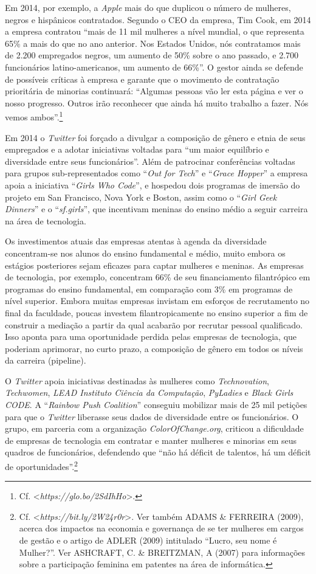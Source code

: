 Em 2014, por exemplo, a \emph{Apple} mais do que duplicou o número de
mulheres, negros e hispânicos contratados. Segundo o CEO da empresa, Tim
Cook, em 2014 a empresa contratou ``mais de 11 mil mulheres a nível
mundial, o que representa 65\% a mais do que no ano anterior. Nos
Estados Unidos, nós contratamos mais de 2.200 empregados negros, um
aumento de 50\% sobre o ano passado, e 2.700 funcionários
latino-americanos, um aumento de 66\%''. O gestor ainda se defende de
possíveis críticas à empresa e garante que o movimento de contratação
prioritária de minorias continuará: ``Algumas pessoas vão ler esta
página e ver o nosso progresso. Outros irão reconhecer que ainda há
muito trabalho a fazer. Nós vemos ambos''.\footnote{Cf.
  \textless{}\emph{https://glo.bo/2SdIhHo}\textgreater{}.}

Em 2014 o \emph{Twitter} foi forçado a divulgar a composição de gênero e
etnia de seus empregados e a adotar iniciativas voltadas para ``um maior
equilíbrio e diversidade entre seus funcionários''. Além de patrocinar
conferências voltadas para grupos sub-representados como ``\emph{Out for
Tech}'' e ``\emph{Grace Hopper}'' a empresa apoia a iniciativa
``\emph{Girls Who Code}'', e hospedou dois programas de imersão do
projeto em San Francisco, Nova York e Boston, assim como o ``\emph{Girl
Geek Dinners}'' e o ``\emph{sf.girls}'', que incentivam meninas do
ensino médio a seguir carreira na área de tecnologia.

Os investimentos atuais das empresas atentas à agenda da diversidade
concentram-se nos alunos do ensino fundamental e médio, muito embora os
estágios posteriores sejam eficazes para captar mulheres e meninas. As
empresas de tecnologia, por exemplo, concentram 66\% de seu
financiamento filantrópico em programas do ensino fundamental, em
comparação com 3\% em programas de nível superior. Embora muitas
empresas invistam em esforços de recrutamento no final da faculdade,
poucas investem filantropicamente no ensino superior a fim de construir
a mediação a partir da qual acabarão por recrutar pessoal qualificado.
Isso aponta para uma oportunidade perdida pelas empresas de tecnologia,
que poderiam aprimorar, no curto prazo, a composição de gênero em todos
os níveis da carreira (pipeline).

O \emph{Twitter} apoia iniciativas destinadas às mulheres como
\emph{Technovation}, \emph{Techwomen}, \emph{LEAD Instituto Ciência da
Computação}, \emph{PyLadies} e \emph{Black Girls CODE}. A
``\emph{Rainbow Push Coalition}'' conseguiu mobilizar mais de 25 mil
petições para que o \emph{Twitter} liberasse seus dados de diversidade
entre os funcionários. O grupo, em parceria com a organização
\emph{ColorOfChange.org}, criticou a dificuldade de empresas de
tecnologia em contratar e manter mulheres e minorias em seus quadros de
funcionários, defendendo que ``não há déficit de talentos, há um déficit
de oportunidades''.\footnote{Cf.
  \textless{}\emph{https://bit.ly/2W24r0r}\textgreater{}.
  Ver também ADAMS \& FERREIRA (2009), acerca dos impactos na economia e
  governança de se ter mulheres em cargos de gestão e o artigo de ADLER
  (2009) intitulado ``Lucro, seu nome é Mulher?''. Ver ASHCRAFT, C. \&
  BREITZMAN, A (2007) para informações sobre a participação feminina em
  patentes na área de informática.}

